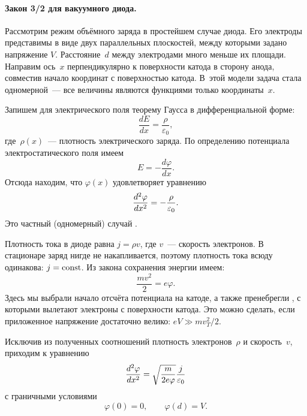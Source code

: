 \paragraph{Закон 3/2 для вакуумного диода.}
Рассмотрим режим объёмного заряда в простейшем случае  диода.
Его электроды представимы в виде двух параллельных плоскостей,
между которыми задано напряжение $V$. Расстояние~$d$ между электродами много
меньше их площади. Направим ось~$x$ перпендикулярно к поверхности катода
в сторону анода, совместив начало координат с поверхностью
катода. В~этой модели задача стала одномерной~--- все величины являются
функциями только координаты~$x$.

Запишем для электрического поля теорему Гаусса в дифференциальной форме:
\[
\frac{dE}{dx} = \frac{\rho}{\varepsilon_0},
\]
где~$\rho(x)$~--- плотность электрического заряда. По определению потенциала
электростатического поля имеем
\[
E = -\frac{d\varphi}{dx}.
\]
Отсюда находим, что $\varphi(x)$ удовлетворяет уравнению
\begin{equation}
	\eqmark{3.14}
	\frac{d^2\varphi}{dx^2}=-\frac{\rho}{\varepsilon_0}.
\end{equation}
Это частный (одномерный) случай .

Плотность тока в диоде равна $j=\rho v$, где $v$~--- скорость электронов.
В стационаре заряд нигде не накапливается, поэтому плотность тока всюду одинакова: $j=\mathrm{const}$.
Из закона сохранения энергии имеем:
\begin{equation*}
	\frac{mv^2}{2}=e\varphi.
\end{equation*}
Здесь мы выбрали начало отсчёта потенциала на катоде, а также
пренебрегли ,
с которыми вылетают электроны с поверхности катода. Это можно сделать, если
приложенное напряжение достаточно велико: $eV\gg mv_{T}^2/2$.

Исключив из полученных соотношений плотность электронов~$\rho$ и скорость~$v$,
приходим к уравнению
\begin{equation}
	\eqmark{3.15}
    \frac{d^2\varphi}{dx^2}=\sqrt{\frac{m}{2e\varphi}} \frac{j}{\varepsilon_0}
\end{equation}
с граничными условиями
\begin{equation*}
 \varphi(0)=0,\qquad \varphi(d)=V.
\end{equation*}

